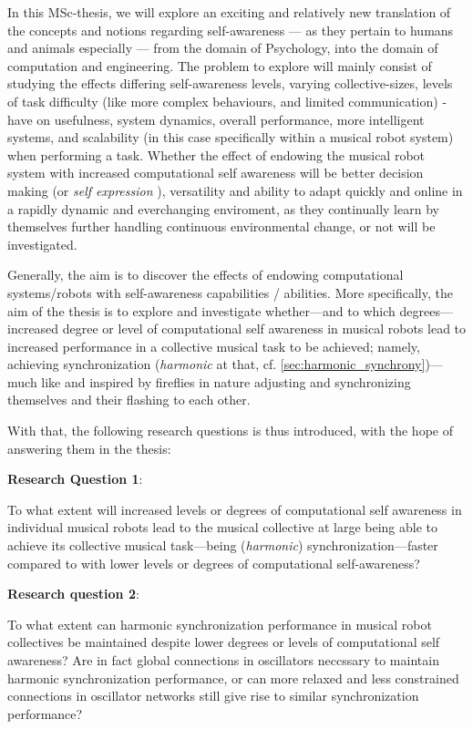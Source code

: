 In this MSc-thesis, we will explore an exciting and relatively new translation of the concepts and notions regarding self-awareness — as they pertain to humans and animals especially — from the domain of Psychology, into the domain of computation and engineering. The problem to explore will mainly consist of studying the effects differing self-awareness levels, varying collective-sizes, levels of task difficulty (like more complex behaviours, and limited communication) - have on usefulness, system dynamics, overall performance, more intelligent systems, and scalability (in this case specifically within a musical robot system) when performing a task. Whether the effect of endowing the musical robot system with increased computational self awareness will be better decision making (or \textit{self expression} \cite{sacs16_ch2}), versatility and ability to adapt quickly and online in a rapidly dynamic and everchanging enviroment, as they continually learn by themselves further handling continuous environmental change, or not will be investigated.

Generally, the aim is to discover the effects of endowing computational systems/robots with self-awareness capabilities / abilities. More specifically, the aim of the thesis is to explore and investigate whether—and to which degrees—increased degree or level of computational self awareness in musical robots lead to increased performance in a collective musical task to be achieved; namely, achieving synchronization (\textit{harmonic} at that, cf. \ref{sec:harmonic_synchrony})—much like and inspired by fireflies in nature adjusting and synchronizing themselves and their flashing to each other.

With that, the following research questions is thus introduced, with the hope of answering them in the thesis: \nl

\textbf{Research Question 1}:

To what extent will increased levels or degrees of computational self awareness in individual musical robots lead to the musical collective at large being able to achieve its collective musical task—being (\textit{harmonic}) synchronization—faster compared to with lower levels or degrees of computational self-awareness? \nl

\textbf{Research question 2}:

To what extent can harmonic synchronization performance in musical robot collectives be maintained despite lower degrees or levels of computational self awareness? Are in fact global connections in oscillators neccssary to maintain harmonic synchronization performance, or can more relaxed and less constrained connections in oscillator networks still give rise to similar synchronization performance? \nl

